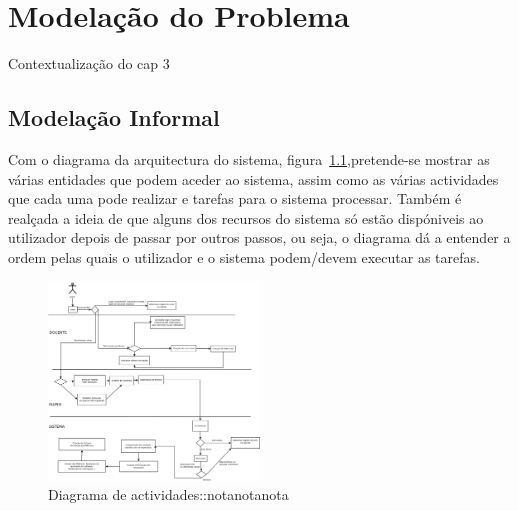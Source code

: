 \newcommand{\rarrow}{\rightarrow}
\newcommand{\larrow}{\leftarrow}
\newcommand{\unif}{\sim}
\def\prop#1#2#3{\noindent\\$\begin{array}{l} \{#1\} \\ #2 \\ \{#3\} \\ \end{array}$\\\\}

\chapter{Modelação do Problema} \label{chap modprob}

Contextualização do cap 3

\section{Modelação Informal}\label{sec modinf}
Com o diagrama da arquitectura do sistema, figura~\ref{fig diaact},pretende-se mostrar as várias entidades que podem aceder ao sistema, assim como as várias
actividades que cada uma pode realizar e tarefas para o sistema processar.
Também é realçada a ideia de que alguns dos recursos do sistema só estão dispóniveis ao utilizador depois 
de passar por outros passos, ou seja, o diagrama dá a entender a ordem pelas quais o utilizador e o sistema podem/devem executar as tarefas.\\

\begin{figure}[htbp]
\begin{center}
\includegraphics[width=0.5\textwidth]{Images/EL-PI}
\caption{Diagrama de actividades::notanotanota}\label{fig diaact}
\end{center}
\end{figure}

